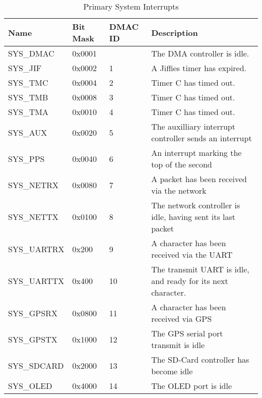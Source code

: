 \documentclass{gqtekspec}
\begin{document}
\begin{table}[htbp]
\begin{center}\begin{tabular}{|p{0.9in}|p{0.75in}|p{0.75in}|p{3.00in}|}\hline
\rowcolor[gray]{0.85} Name & Bit Mask & DMAC ID &Description \\\hline\hline
SYS\_DMAC   & 0x0001 && The DMA controller is idle.\\\hline
SYS\_JIF    & 0x0002 & 1 & A Jiffies timer has expired.\\\hline
SYS\_TMC    & 0x0004 & 2 & Timer C has timed out.\\\hline
SYS\_TMB    & 0x0008 & 3 & Timer C has timed out.\\\hline
SYS\_TMA    & 0x0010 & 4 & Timer C has timed out.\\\hline
SYS\_AUX    & 0x0020 & 5 & The auxilliary interrupt controller sends an interrupt\\\hline
SYS\_PPS    & 0x0040 & 6 & An interrupt marking the top of the second\\\hline
SYS\_NETRX  & 0x0080 & 7 & A packet has been received via the network\\\hline
SYS\_NETTX  & 0x0100 & 8 & The network controller is idle, having sent its
			last packet\\\hline
SYS\_UARTRX & 0x200 &  9 & A character has been received via the UART\\\hline
SYS\_UARTTX & 0x400 & 10 & The transmit UART is idle, and ready for its next
		character.\\\hline
SYS\_GPSRX  & 0x0800 & 11 & A character has been received via GPS\\\hline
SYS\_GPSTX  & 0x1000 & 12 & The GPS serial port transmit is idle\\\hline
SYS\_SDCARD & 0x2000 & 13 & The SD-Card controller has become idle\\\hline
SYS\_OLED   & 0x4000 & 14 & The OLED port is idle\\\hline
\end{tabular}
\caption{Primary System Interrupts}\label{tbl:sys-ints}
\end{center}\end{table}
\end{document}
